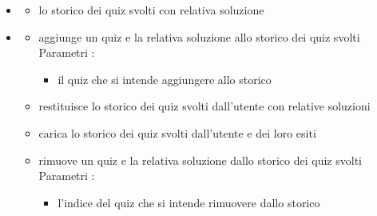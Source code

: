 \begin{itemize}
\item {}
\begin{itemize}
\item {}
\newline
lo storico dei quiz svolti con relativa soluzione
\end{itemize}
\item {}
\begin{itemize}
\item {}
\newline
aggiunge un quiz e la relativa soluzione allo storico dei quiz svolti
\newline
Parametri :
\begin{itemize}
\item {}
\newline
il quiz che si intende aggiungere allo storico
\end{itemize}
\item {}
\newline
restituisce lo storico dei quiz svolti dall'utente con relative soluzioni
\newline
\item {}
\newline
carica lo storico dei quiz svolti dall'utente e dei loro esiti
\newline
\item {}
\newline
rimuove un quiz e la relativa soluzione dallo storico dei quiz svolti
\newline
Parametri :
\begin{itemize}
\item {}
\newline
l'indice del quiz che si intende rimuovere dallo storico
\end{itemize}
\end{itemize}
\end{itemize}
